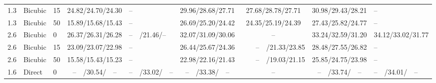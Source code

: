 \documentclass[10pt,twocolumn,letterpaper]{article}
\begin{document}
\begin{table}[!htbp]
\begin{tabular}{|p{0.84cm}<{\centering}|p{0.8cm}<{\centering}|p{0.8cm}<{\centering}|c|p{1.4cm}<{\centering}| c|c|c|p{1.8cm}<{\centering}|}
 1.3 & Bicubic & 15 &\textcolor[rgb]{0.45,0.45,0.45}{24.82}/\textcolor[rgb]{0.45,0.45,0.45}{24.70}/\textcolor[rgb]{0.45,0.45,0.45}{24.30} & --  & 29.96/28.68/27.71 & 27.68/28.78/27.71 & \textcolor[rgb]{1.00,0.00,0.00}{30.98}/\textcolor[rgb]{1.00,0.00,0.00}{29.43}/\textcolor[rgb]{1.00,0.00,0.00}{28.21} & --\\
   1.3 & Bicubic & 50 &\textcolor[rgb]{0.45,0.45,0.45}{15.89}/\textcolor[rgb]{0.45,0.45,0.45}{15.68}/\textcolor[rgb]{0.45,0.45,0.45}{15.43}& -- & 26.69/25.20/24.42 & 24.35/25.19/24.39 & \textcolor[rgb]{1.00,0.00,0.00}{27.43}/\textcolor[rgb]{1.00,0.00,0.00}{25.82}/\textcolor[rgb]{1.00,0.00,0.00}{24.77} & --\\
\cline{1-9}
2.6 & Bicubic & 0 &\textcolor[rgb]{0.45,0.45,0.45}{26.37}/\textcolor[rgb]{0.45,0.45,0.45}{26.31}/\textcolor[rgb]{0.45,0.45,0.45}{26.28} & --~~/\textcolor[rgb]{0.45,0.45,0.45}{21.46}/--~~  & 32.07/31.09/30.06  &  -- & 33.24/32.59/31.20  &  \textcolor[rgb]{1.00,0.00,0.00}{34.12}/\textcolor[rgb]{1.00,0.00,0.00}{33.02}/\textcolor[rgb]{1.00,0.00,0.00}{31.77} \\
  2.6 & Bicubic & 15  &\textcolor[rgb]{0.45,0.45,0.45}{23.09}/\textcolor[rgb]{0.45,0.45,0.45}{23.07}/\textcolor[rgb]{0.45,0.45,0.45}{22.98} & -- & 26.44/25.67/24.36 & ~~~~--~~/21.33/23.85& \textcolor[rgb]{1.00,0.00,0.00}{28.48}/\textcolor[rgb]{1.00,0.00,0.00}{27.55}/\textcolor[rgb]{1.00,0.00,0.00}{26.82} & -- \\
  2.6 & Bicubic & 50 &\textcolor[rgb]{0.45,0.45,0.45}{15.58}/\textcolor[rgb]{0.45,0.45,0.45}{15.43}/\textcolor[rgb]{0.45,0.45,0.45}{15.23} & --  & 22.98/22.16/21.43 & ~~~~--~~/19.03/21.15 & \textcolor[rgb]{1.00,0.00,0.00}{25.85}/\textcolor[rgb]{1.00,0.00,0.00}{24.75}/\textcolor[rgb]{1.00,0.00,0.00}{23.98} & --\\\hline\hline

 1.6 & Direct &  0 &--~~/\textcolor[rgb]{0.45,0.45,0.45}{30.54}/~~-- & --~~/33.02/~~--  & --~~/33.38/~~-- & -- & --~~/33.74/~~-- & --~~/\textcolor[rgb]{1.00,0.00,0.00}{34.01}/~~-- \\\hline
\end{tabular}
\label{table2}\vspace{-0.2cm}
\end{table}
\end{document}
